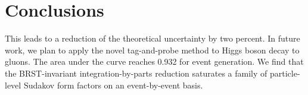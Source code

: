 \section{Conclusions}\label{sec:conclusions}

This leads to a reduction of the theoretical uncertainty by two percent.
In future work, we plan to apply the novel tag-and-probe method to Higgs
boson decay to gluons. The area under the curve reaches 0.932 for event
generation. We find that the BRST-invariant integration-by-parts
reduction saturates a family of particle-level Sudakov form factors on
an event-by-event basis.

